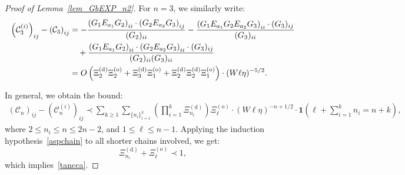 \documentclass[10pt,reqno]{article}
\theoremstyle{plain} %
\theoremstyle{remark}
\numberwithin{equation}{section}
\begin{document}
\begin{proof}[Proof of Lemma~\ref{lem_GbEXP_n2}]
For \( n = 3 \), we similarly write:
\begin{align}
\left( \mathcal{C}^{(i)}_3 \right)_{ij} - \left( \mathcal{C}_3 \right)_{ij}
&= - \frac{\left( G_1 E_{a_1} G_2 \right)_{ii} \cdot \left( G_2 E_{a_2} G_3 \right)_{ij}}{(G_2)_{ii}} 
- \frac{\left( G_1 E_{a_1} G_2 E_{a_2} G_3 \right)_{ii} \cdot (G_3)_{ij}}{(G_3)_{ii}} \\
&\quad + \frac{\left( G_1 E_{a_1} G_2 \right)_{ii} \cdot \left( G_2 E_{a_2} G_3 \right)_{ii} \cdot (G_3)_{ij}}{(G_2)_{ii} (G_3)_{ii}} \notag \\
&= O\left( \Xi^{(\mathrm{d})}_2 \Xi^{(\mathrm{o})}_2 + \Xi^{(\mathrm{d})}_3 \Xi^{(\mathrm{o})}_1 
+ \Xi^{(\mathrm{d})}_2 \Xi^{(\mathrm{d})}_2 \Xi^{(\mathrm{o})}_1 \right) \cdot (W \ell \eta)^{-5/2}.
\end{align}

In general, we obtain the bound:
\begin{align} \label{jasuznns}
\left( \mathcal{C}_n \right)_{ij} - \left( \mathcal{C}^{(i)}_n \right)_{ij}
\prec \sum_{k \ge 1} \sum_{\{n_i\}_{i=1}^k} \left( \prod_{i=1}^k \Xi^{(\mathrm{d})}_{n_i} \right) \Xi^{(\mathrm{o})}_\ell \cdot (W \ell \eta)^{-n + 1/2} \cdot \mathbf{1}\left( \ell + \sum_{i=1}^k n_i = n + k \right),
\end{align}
where \( 2 \le n_i \le n \le 2n - 2 \), and \( 1 \le \ell \le n - 1 \). Applying the induction hypothesis~\eqref{aspchain} to all shorter chains involved, we get:
\[
\Xi^{(\mathrm{d})}_{n_i} + \Xi^{(\mathrm{o})}_\ell \prec 1,
\]
which implies~\eqref{tancca}.


\end{proof}
\end{document}
